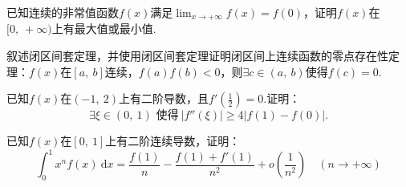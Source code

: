\documentclass[UTF8,14pt,normal]{ctexart}
\begin{document}
    已知连续的非常值函数$f(x)$满足$\displaystyle\lim_{x\to+\infty}f(x)=f(0)$，证明$f(x)$在$[0,\ +\infty)$上有最大值或最小值.\vspace{0.5em}
    
    叙述闭区间套定理，并使用闭区间套定理证明闭区间上连续函数的零点存在性定理：$f(x)$在$[a,\ b]$连续，$f(a)f(b)<0$，则$\exists c \in (a,\ b)$使得$f(c)=0$.\vspace{0.5em}
    
    已知$f(x)$在$(-1,\ 2)$上有二阶导数，且$f'(\frac12)=0$.证明：
    $$\exists \xi \in (0,\ 1)\text{ 使得}\ |f''(\xi)| \ge 4|f(1) - f(0)|\text{.}$$
    
    已知$f(x)$在$[0,\ 1]$上有二阶连续导数，证明：
    $$ \displaystyle\int_0^1 x^nf(x)\ \mathrm dx = \dfrac{f(1)}n-\dfrac{f(1) + f'(1)}{n^2}+o(\dfrac1{n^2})\quad(n\to+\infty)$$

    
\end{document}
